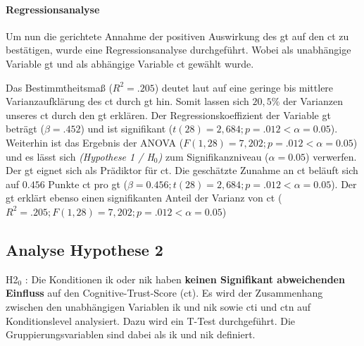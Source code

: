 \documentclass[a4paper,11pt]{article}%
\renewcommand{\\}{\vspace*{0.5\baselineskip} \newline}
\begin{document}
\paragraph{Regressionsanalyse}
Um nun die gerichtete Annahme der positiven Auswirkung des \ac{gt} auf den \ac{ct} zu bestätigen, wurde eine Regressionsanalyse durchgeführt. Wobei als unabhängige Variable \ac{gt} und als abhängige Variable \ac{ct} gewählt wurde.
%

Das Bestimmtheitsmaß ($R^{2} = .205$) deutet laut \citep{cohen2013statistical} auf eine geringe bis mittlere Varianzaufklärung des \ac{ct} durch \ac{gt} hin. Somit lassen sich $20,5\%$ der Varianzen unseres \ac{ct} durch den \ac{gt} erklären. \\
Der Regressionskoeffizient der Variable \ac{gt} beträgt ($\beta = .452$) und ist signifikant ($t(28) = 2,684; p = .012 < \alpha = 0.05$). \\
Weiterhin ist das Ergebnis der ANOVA ($F(1,28) = 7,202; p = .012 < \alpha = 0.05$) und es lässt sich \textit{(Hypothese 1 / H$_{0}$)} zum Signifikanzniveau ($\alpha = 0.05$) verwerfen. \\
Der \ac{gt} eignet sich als Prädiktor für \ac{ct}. Die geschätzte Zunahme an \ac{ct} beläuft sich auf $0.456$ Punkte \ac{ct} pro \ac{gt} ($\beta = 0.456; t(28) = 2,684; p = .012 < \alpha = 0.05$). \\
Der \ac{gt} erklärt ebenso einen signifikanten Anteil der Varianz von \ac{ct} ($R^{2} = .205; F(1,28) = 7,202; p = .012 < \alpha = 0.05$)


\newpage
	\subsection{Analyse Hypothese 2}
H2$_{0}$ : Die Konditionen \ac{ik} oder \ac{nik} haben \textbf{keinen Signifikant abweichenden Einfluss} auf den Cognitive-Trust-Score (\ac{ct}).\\
Es wird der Zusammenhang zwischen den unabhängigen Variablen \ac{ik} und \ac{nik} sowie \ac{cti} und \ac{ctn} auf Konditionslevel analysiert. Dazu wird ein T-Test durchgeführt. Die Gruppierungsvariablen sind dabei als \ac{ik} und \ac{nik} definiert.
\end{document}
